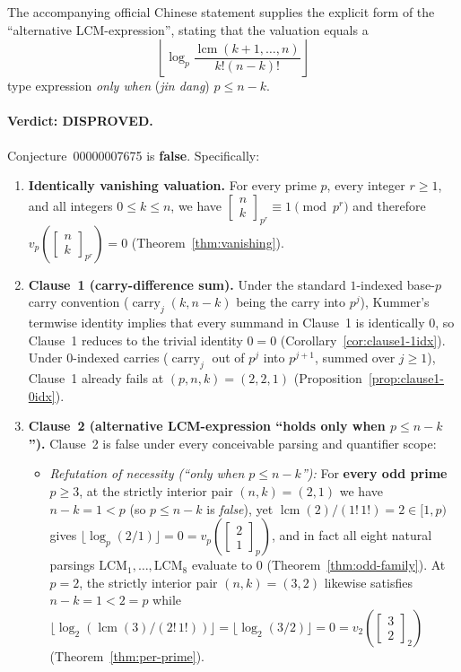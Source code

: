 \documentclass[11pt,a4paper]{article}
\theoremstyle{definition}
\theoremstyle{remark}
\newcommand{\qbinom}[3]{\begin{bmatrix} #1 \\ #2 \end{bmatrix}_{#3}}
\newcommand{\lcm}{\operatorname{lcm}}
\newcommand{\carry}{\operatorname{carry}}
\begin{document}
\noindent
The accompanying official Chinese statement supplies the explicit form of the
``alternative LCM-expression'', stating that the valuation equals a
\[
  \left\lfloor \log_p \frac{\lcm(k+1,\dots,n)}{k!(n-k)!} \right\rfloor
\]
type expression \emph{only when} (\emph{jin dang}) $p \le n - k$.

\paragraph{Verdict: DISPROVED.}
Conjecture~00000007675 is \textbf{false}. Specifically:
\begin{enumerate}
  \item \textbf{Identically vanishing valuation.} For every prime $p$, every integer
    $r \ge 1$, and all integers $0 \le k \le n$, we have
    $\qbinom{n}{k}{p^r} \equiv 1 \pmod{p^r}$ and therefore
    $v_p\!\left(\qbinom{n}{k}{p^r}\right) = 0$ (Theorem~\ref{thm:vanishing}).
  \item \textbf{Clause~1 (carry-difference sum).} Under the standard $1$-indexed
    base-$p$ carry convention ($\carry_j(k,n-k)$ being the carry into $p^j$),
    Kummer's termwise identity implies that every summand in Clause~1 is
    identically $0$, so Clause~1 reduces to the trivial identity $0 = 0$
    (Corollary~\ref{cor:clause1-1idx}). Under $0$-indexed carries ($\carry_j$ out of
    $p^j$ into $p^{j+1}$, summed over $j \ge 1$), Clause~1 already fails at
    $(p,n,k) = (2,2,1)$ (Proposition~\ref{prop:clause1-0idx}).
  \item \textbf{Clause~2 (alternative LCM-expression ``holds only when $p \le n - k$'').}
    Clause~2 is false under every conceivable parsing and quantifier scope:
    \begin{itemize}
      \item \emph{Refutation of necessity (``only when $p \le n - k$''):} For
        \textbf{every odd prime $p \ge 3$}, at the strictly interior pair
        $(n,k) = (2,1)$ we have $n - k = 1 < p$ (so $p \le n - k$ is \emph{false}),
        yet $\lcm(2)/ (1!\,1!) = 2 \in [1,p)$ gives
        $\lfloor \log_p(2/1)\rfloor = 0 = v_p\!\left(\qbinom{2}{1}{p}\right)$, and
        in fact all eight natural parsings $\mathrm{LCM}_1,\dots,\mathrm{LCM}_8$
        evaluate to $0$ (Theorem~\ref{thm:odd-family}). At $p = 2$, the strictly
        interior pair $(n,k) = (3,2)$ likewise satisfies $n - k = 1 < 2 = p$ while
        $\lfloor \log_2(\lcm(3)/(2!\,1!))\rfloor = \lfloor \log_2(3/2)\rfloor = 0
        = v_2\!\left(\qbinom{3}{2}{2}\right)$ (Theorem~\ref{thm:per-prime}).

\end{itemize}
\end{enumerate}
\end{document}
